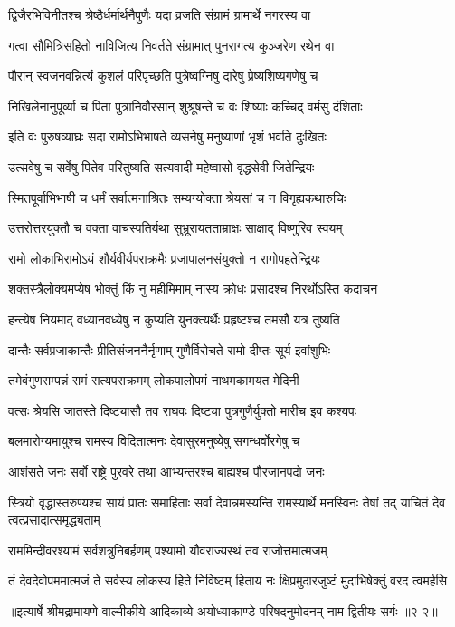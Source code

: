 \twolineshloka
{द्विजैरभिविनीतश्च श्रेष्ठैर्धर्मार्थनैपुणैः}
{यदा व्रजति संग्रामं ग्रामार्थे नगरस्य वा} %

\twolineshloka
{गत्वा सौमित्रिसहितो नाविजित्य निवर्तते}
{संग्रामात् पुनरागत्य कुञ्जरेण रथेन वा} %

\twolineshloka
{पौरान् स्वजनवन्नित्यं कुशलं परिपृच्छति}
{पुत्रेष्वग्निषु दारेषु प्रेष्यशिष्यगणेषु च} %

\twolineshloka
{निखिलेनानुपूर्व्या च पिता पुत्रानिवौरसान्}
{शुश्रूषन्ते च वः शिष्याः कच्चिद् वर्मसु दंशिताः} %

\twolineshloka
{इति वः पुरुषव्याघ्रः सदा रामोऽभिभाषते}
{व्यसनेषु मनुष्याणां भृशं भवति दुःखितः} %

\twolineshloka
{उत्सवेषु च सर्वेषु पितेव परितुष्यति}
{सत्यवादी महेष्वासो वृद्धसेवी जितेन्द्रियः} %

\twolineshloka
{स्मितपूर्वाभिभाषी च धर्मं सर्वात्मनाश्रितः}
{सम्यग्योक्ता श्रेयसां च न विगृह्यकथारुचिः} %

\twolineshloka
{उत्तरोत्तरयुक्तौ च वक्ता वाचस्पतिर्यथा}
{सुभ्रूरायतताम्राक्षः साक्षाद् विष्णुरिव स्वयम्} %

\twolineshloka
{रामो लोकाभिरामोऽयं शौर्यवीर्यपराक्रमैः}
{प्रजापालनसंयुक्तो न रागोपहतेन्द्रियः} %

\twolineshloka
{शक्तस्त्रैलोक्यमप्येष भोक्तुं किं नु महीमिमाम्}
{नास्य क्रोधः प्रसादश्च निरर्थोऽस्ति कदाचन} %

\twolineshloka
{हन्त्येष नियमाद् वध्यानवध्येषु न कुप्यति}
{युनक्त्यर्थैः प्रहृष्टश्च तमसौ यत्र तुष्यति} %

\twolineshloka
{दान्तैः सर्वप्रजाकान्तैः प्रीतिसंजननैर्नृणाम्}
{गुणैर्विरोचते रामो दीप्तः सूर्य इवांशुभिः} %

\twolineshloka
{तमेवंगुणसम्पन्नं रामं सत्यपराक्रमम्}
{लोकपालोपमं नाथमकामयत मेदिनी} %

\twolineshloka
{वत्सः श्रेयसि जातस्ते दिष्ट्यासौ तव राघवः}
{दिष्ट्या पुत्रगुणैर्युक्तो मारीच इव कश्यपः} %

\twolineshloka
{बलमारोग्यमायुश्च रामस्य विदितात्मनः}
{देवासुरमनुष्येषु सगन्धर्वोरगेषु च} %

\twolineshloka
{आशंसते जनः सर्वो राष्ट्रे पुरवरे तथा}
{आभ्यन्तरश्च बाह्यश्च पौरजानपदो जनः} %

\threelineshloka
{स्त्रियो वृद्धास्तरुण्यश्च सायं प्रातः समाहिताः}
{सर्वा देवान्नमस्यन्ति रामस्यार्थे मनस्विनः}
{तेषां तद् याचितं देव त्वत्प्रसादात्समृद्ध्यताम्} %

\twolineshloka
{राममिन्दीवरश्यामं सर्वशत्रुनिबर्हणम्}
{पश्यामो यौवराज्यस्थं तव राजोत्तमात्मजम्} %

\twolineshloka
{तं देवदेवोपममात्मजं ते सर्वस्य लोकस्य हिते निविष्टम्}
{हिताय नः क्षिप्रमुदारजुष्टं मुदाभिषेक्तुं वरद त्वमर्हसि} %


॥इत्यार्षे श्रीमद्रामायणे वाल्मीकीये आदिकाव्ये अयोध्याकाण्डे परिषदनुमोदनम् नाम द्वितीयः सर्गः ॥२-२॥
